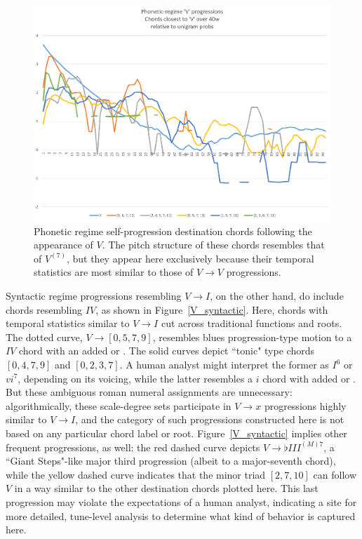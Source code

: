 \begin{figure}[h]
	\caption{Phonetic regime self-progression destination chords following the appearance of $V$.  The pitch structure of these chords resembles that of $V^{(7)}$, but they appear here exclusively because their temporal statistics are most similar to those of $V \rightarrow V$ progressions.}
	\label{V_phonetic}
	\centering
	\includegraphics[width=6in]{V_phonetic.png}
\end{figure}

Syntactic regime progressions resembling $V \rightarrow I$, on the other hand, do include chords resembling $IV$, as shown in Figure~\ref{V_syntactic}.  Here, chords with temporal statistics similar to $V \rightarrow I$ cut across traditional functions and roots.  The dotted curve, $V \rightarrow [0,5,7,9]$, resembles blues progression-type motion to a $IV$ chord with an added  or .  The solid curves depict ``tonic" type chords $[0,4,7,9]$ and $[0,2,3,7]$.  A human analyst might interpret the former as $I^6$ or $vi^7$, depending on its voicing, while the latter resembles a $i$ chord with added  or .  But these ambiguous roman numeral assignments are unnecessary: algorithmically, these scale-degree sets participate in $V \rightarrow x$ progressions highly similar to $V \rightarrow I$, and the category of such progressions constructed here is not based on any particular chord label or root.  Figure~\ref{V_syntactic} implies other frequent progressions, as well: the red dashed curve depicts $V \rightarrow \flat III^{(M)7}$, a ``Giant Steps"-like major third progression (albeit to a major-seventh chord), while the yellow dashed curve indicates that the minor triad $[2,7,10]$ can follow $V$ in a way similar to the other destination chords plotted here.  This last progression may violate the expectations of a human analyst, indicating a site for more detailed, tune-level analysis to determine what kind of behavior is captured here.

